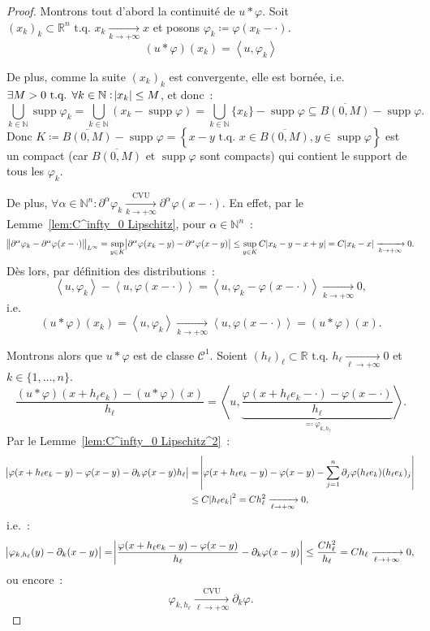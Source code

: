 \documentclass{report}
\DeclareMathOperator{\supp}{supp}
\newcommand{\R}{{\mathbb R}}
\newcommand{\N}{{\mathbb N}}
\newcommand{\scpr}[2]{\left\langle#1, #2\right\rangle}
\newcommand{\tq}{\text{ t.q. }}
\newcommand{\st}{\tq}
\newcommand{\pinfty}{{+\infty}}
\theoremstyle{definition}
\theoremstyle{remark}
\begin{document}
\begin{proof} Montrons tout d'abord la continuité de $u * \varphi$. Soit $(x_k)_k \subset \R^n \st x_k \xrightarrow[k \to \pinfty]{} x$ et posons
$\varphi_k \coloneqq \varphi(x_k-\cdot)$.
\[(u * \varphi)(x_k) = \scpr u{\varphi_k}\]

De plus, comme la suite $(x_k)_k$ est convergente, elle est bornée, i.e. $\exists M > 0 \st \forall k \in \N : \abs {x_k} \leq M$, et donc~:
\[\bigcup_{k \in \N}\supp\varphi_k = \bigcup_{k \in \N}\left(x_k-\supp\varphi\right) = \bigcup_{k \in \N}\{x_k\} - \supp\varphi \subseteq \overline {B(0, M)} - \supp\varphi.\]
Donc $K \coloneqq \overline {B(0, M)} - \supp\varphi = \left\{x-y \st x \in \overline {B(0, M)}, y \in \supp\varphi\right\}$ est un compact (car $\overline {B(0, M)}$
et $\supp\varphi$ sont compacts) qui contient le support de tous les $\varphi_k$.

De plus, $\forall \alpha \in \N^n : \partial^\alpha\varphi_k \xrightarrow[k \to \pinfty]{\text{CVU}} \partial^\alpha\varphi(x-\cdot)$. En effet, par le
Lemme~\ref{lem:C^infty_0 Lipschitz}, pour $\alpha \in \N^n$~:
\[\norm {\partial^\alpha\varphi_k - \partial^\alpha\varphi(x-\cdot)}_{L^\infty} = \sup_{y \in K}\abs {\partial^\alpha\varphi(x_k-y) - \partial^\alpha\varphi(x-y)}
	\leq \sup_{y \in K}C\abs {x_k-y-x+y} = C\abs {x_k-x} \xrightarrow[k \to \pinfty]{} 0.\]
Dès lors, par définition des distributions~:
\[\scpr u{\varphi_k} - \scpr u{\varphi(x-\cdot)} = \scpr u{\varphi_k-\varphi(x-\cdot)} \xrightarrow[k \to \pinfty]{} 0,\]
i.e.
\[(u*\varphi)(x_k) = \scpr u{\varphi_k} \xrightarrow[k \to \pinfty]{} \scpr u{\varphi(x-\cdot)} = (u*\varphi)(x).\]

Montrons alors que $u * \varphi$ est de classe $\mathcal C^1$. Soient $(h_\ell)_\ell \subset \R \st h_\ell \xrightarrow[\ell \to \pinfty]{} 0$ et $k \in \{1, \ldots, n\}$.
\[\frac {(u*\varphi)(x+h_\ell e_k) - (u*\varphi)(x)}{h_\ell} = \scpr u{\underbrace {\frac {\varphi(x+h_\ell e_k - \cdot) - \varphi(x-\cdot)}{h_\ell}}_{\eqqcolon \varphi_{k,h_\ell}}}.\]
Par le Lemme~\ref{lem:C^infty_0 Lipschitz^2}~:
\begin{align*}
	\abs {\varphi(x+h_\ell e_k - y) - \varphi(x-y) - \partial_k\varphi(x-y)h_\ell}
			&= \abs {\varphi(x+h_\ell e_k - y) - \varphi(x-y) - \sum_{j=1}^n\partial_j\varphi(h_\ell e_k)(h_\ell e_k)_j} \\
	&\leq C\abs {h_\ell e_k}^2 = Ch_\ell^2 \xrightarrow[\ell \to \pinfty]{} 0,
\end{align*}
i.e.~:
\begin{equation}\label{eq:borne varphi_k,h ell - partial_k varphi}
	\abs {\varphi_{k,h_\ell}(y) - \partial_k(x-y)} = \abs {\frac {\varphi(x+h_\ell e_k - y) - \varphi(x-y)}{h_\ell} - \partial_k\varphi(x-y)}
	\leq \frac {Ch_\ell^2}{h_\ell} = Ch_\ell \xrightarrow[\ell \to \pinfty]{} 0,
\end{equation}
ou encore~:
\[\varphi_{k,h_\ell} \xrightarrow[\ell \to \pinfty]{\text{CVU}} \partial_k\varphi.\]


\end{proof}
\end{document}

